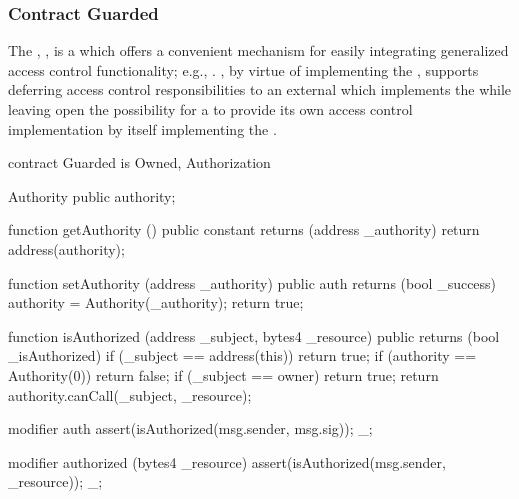 \subsubsection{Contract Guarded}

The , , is a  which offers a
convenient mechanism for easily integrating generalized  access
control functionality; e.g., .
, by virtue of implementing the , supports deferring access control responsibilities to an external
 which implements the  while leaving
open the possibility for a  to provide its own access control
implementation by itself implementing the .


\begin{solidity}
contract Guarded is Owned, Authorization {
  Authority public authority;

  function getAuthority () public constant returns (address _authority) {
    return address(authority);
  }

  function setAuthority (address _authority) public auth returns (bool _success) {
    authority = Authority(_authority);
    return true;
  }

  function isAuthorized (address _subject, bytes4 _resource) public returns (bool _isAuthorized) {
    if (_subject == address(this)) return true;
    if (authority == Authority(0)) return false;
    if (_subject == owner) return true;
    return authority.canCall(_subject, _resource);
  }

  modifier auth {
    assert(isAuthorized(msg.sender, msg.sig));
    _;
  }

  modifier authorized (bytes4 _resource) {
    assert(isAuthorized(msg.sender, _resource));
    _;
  }
}
\end{solidity}


